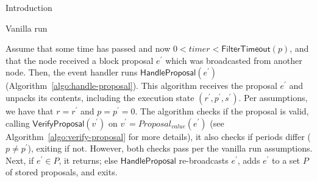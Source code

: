 \documentclass[10pt,a4paper]{article}
\begin{document}
\begin{section}{Introduction}
\begin{subsection}{Vanilla run}
%


Assume that some time has passed and now $0<timer<\mathsf{FilterTimeout}(p)$, and that 
the node received a block proposal $e^\prime$ which was broadcasted from another node. 
Then, the event handler runs $\mathsf{HandleProposal}(e^\prime)$ (Algorithm~\ref{algo:handle-proposal}).
This algorithm receives the proposal $e^\prime$ and unpacks its contents,
including the execution state $(r^\prime,p^\prime,s^\prime)$.
Per assumptions, we have that $r=r^\prime$ and $p=p^\prime=0$.
The algorithm checks if the proposal is valid, calling $\mathsf{VerifyProposal}(v^\prime)$ 
on $v^\prime=Proposal_{value}(e^\prime)$ (see Algorithm~\ref{algo:verify-proposal} for more details),
it also checks if periods differ ($p\neq p^\prime$), exiting if not. However, both checks pass per 
the vanilla run assumptions.
Next, if $e^\prime\in P$, it returns; else $\mathsf{HandleProposal}$ re-broadcasts $e^\prime$, 
adds $e^\prime$ to a set $P$ of stored proposals, and exits.



\end{subsection}
\end{section}
\end{document}
